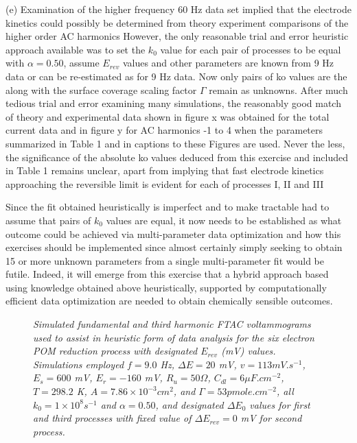 \documentclass[a4paper, 12pt]{article}
\begin{document}
(e) Examination of the higher frequency 60 Hz data set implied that the 
electrode kinetics could possibly be determined from theory experiment 
comparisons of the higher order AC harmonics However, the only reasonable trial 
and error heuristic approach available was to set the $k_0$ value for each pair 
of processes to be equal with $\alpha = 0.50$, assume $E_{rev}$ values and other 
parameters are known from 9 Hz data or can be re-estimated as for 9 Hz data. Now 
only  pairs of ko values are the along with the surface coverage scaling factor 
$\Gamma$ remain as unknowns. After much tedious trial and error examining many 
simulations, the reasonably good match of theory and experimental data shown in 
figure x was obtained for the total current data and in figure y for AC 
harmonics -1 to 4 when the parameters summarized in Table 1 and in captions to 
these Figures are used.  Never the less, the significance of the absolute ko 
values deduced from this exercise and included in Table 1 remains unclear, apart 
from implying  that fast electrode kinetics  approaching the reversible limit is 
evident for each of processes I, II and III

Since the fit obtained heuristically is imperfect and to make tractable had to 
assume that pairs of $k_0$ values are equal, it now needs to be established as what 
outcome could be achieved   via multi-parameter data optimization and how this 
exercises should be implemented since almost certainly simply seeking to obtain 
15 or more unknown parameters from a single multi-parameter fit would be futile.  
Indeed, it will emerge from this exercise that a hybrid approach based using 
knowledge obtained above heuristically, supported by computationally efficient 
data optimization are needed to obtain chemically sensible outcomes.

\begin{figure}[htbp]
    \caption{\it{Simulated fundamental and third harmonic FTAC voltammograms 
    used to assist in heuristic form of data analysis for the six electron POM 
    reduction process with designated $E_{rev}$ (mV) values. Simulations 
    employed $f = 9.0$ Hz, $\Delta E = 20$ mV, $v = 113 mV.s^{-1}$, $E_{s} = 
    600$ mV, $E_{r} = -160$ mV, $R_u = 50 \Omega$, $C_{dl} = 6 \mu 
    F.cm^{-2}$, $T = 298.2$ K, $A = 7.86 \times 10^{-3} cm^2$, and $\Gamma = 53 
    pmole.cm^{-2}$, all $k_0 = 1 \times 10^8 s^{-1}$ and $\alpha =0.50$, and 
    designated $\Delta E_0$ values for first and third processes with fixed 
    value of  $\Delta E_{rev} = 0$ mV for second process.}}
    \label{fig:sim_for_heuristic_E}
\end{figure}
\end{document}
